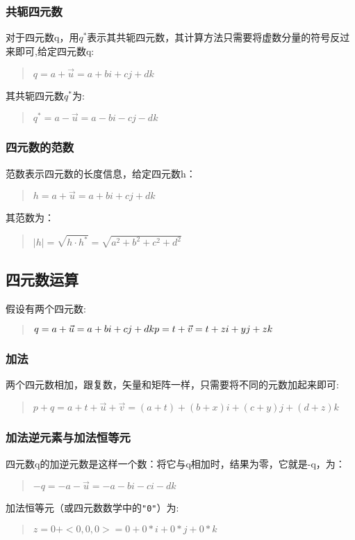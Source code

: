 \documentclass[a4paper,10pt]{article}
\begin{document}
\begin{CJK}{UTF8}{song}
\subsubsection{共轭四元数}
对于四元数q，用$q^{*}$表示其共轭四元数，其计算方法只需要将虚数分量的符号反过来即可,给定四元数q:
\begin{quote}
$ q=a+\vec{u}=a+bi+cj+dk$
\end{quote}
其共轭四元数$q^{*}$为:
\begin{quote}
$ q^{*}=a-\vec{u}=a-bi-cj-dk$
\end{quote}
\subsubsection{四元数的范数}
范数表示四元数的长度信息，给定四元数h：
\begin{quote}
$ h=a+\vec{u}=a+bi+cj+dk$
\end{quote}
其范数为：
\begin{quote}
$|h|=\sqrt{h\cdot h^{*}}=\sqrt{a^{2}+b^{2}+c^{2}+d^{2}}$
\end{quote}


\subsection{四元数运算}
假设有两个四元数:
\begin{quote}
\begin{math}
q=a+\vec{u}=a+bi+cj+dk \\
p=t+\vec{v}=t+zi+yj+zk
\end{math}
\end{quote}
\subsubsection{加法}
两个四元数相加，跟复数，矢量和矩阵一样，只需要将不同的元数加起来即可:
\begin{quote}
\begin{math}
p+q=a+t+\vec{u}+\vec{v}=(a+t)+(b+x)i+(c+y)j+(d+z)k
\end{math}
\end{quote}
\subsubsection{加法逆元素与加法恒等元}
四元数q的加逆元数是这样一个数：将它与q相加时，结果为零，它就是-q，为：
\begin{quote}
$-q=-a-\vec{u}=-a-bi-ci-dk $
\end{quote}
加法恒等元（或四元数数学中的\verb|"0"|）为:
\begin{quote}
$z=0+<0,0,0>=0+0*i+0*j+0*k $
\end{quote}

\end{CJK}
\end{document}
